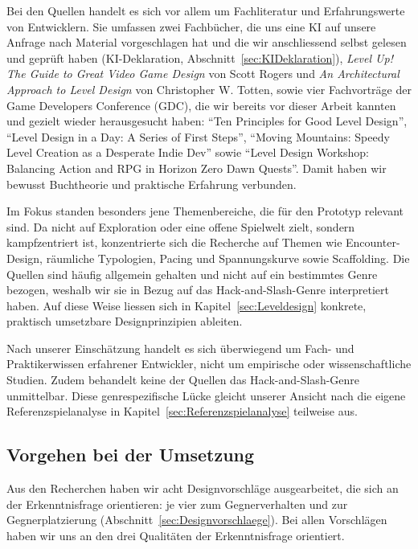 \documentclass[../Main.tex]{subfiles}
\begin{document}
Bei den Quellen handelt es sich vor allem um Fachliteratur und Erfahrungswerte von Entwicklern. Sie umfassen zwei Fachbücher, die uns eine KI auf unsere Anfrage nach Material vorgeschlagen hat und die wir anschliessend selbst gelesen und geprüft haben (KI-Deklaration, Abschnitt~\ref{sec:KIDeklaration}), \textit{Level Up! The Guide to Great Video Game Design} von Scott Rogers\autocite{rogers2014levelup} und \textit{An Architectural Approach to Level Design} von Christopher W. Totten\autocite{totten2014architectural}, sowie vier Fachvorträge der Game Developers Conference (GDC), die wir bereits vor dieser Arbeit kannten und gezielt wieder herausgesucht haben: \enquote{Ten Principles for Good Level Design}\autocite{gdc_tenprinciples2010}, \enquote{Level Design in a Day: A Series of First Steps}\autocite{gdc_leveldesignaday2020}, \enquote{Moving Mountains: Speedy Level Creation as a Desperate Indie Dev}\autocite{gdc_movingmountains2020} sowie \enquote{Level Design Workshop: Balancing Action and RPG in Horizon Zero Dawn Quests}\autocite{gdc_horizonquests2018}. Damit haben wir bewusst Buchtheorie und praktische Erfahrung verbunden.

Im Fokus standen besonders jene Themenbereiche, die für den Prototyp relevant sind. Da  nicht auf Exploration oder eine offene Spielwelt zielt, sondern kampfzentriert ist, konzentrierte sich die Recherche auf Themen wie Encounter-Design, räumliche Typologien, Pacing und Spannungskurve sowie Scaffolding. Die Quellen sind häufig allgemein gehalten und nicht auf ein bestimmtes Genre bezogen, weshalb wir sie in Bezug auf das Hack-and-Slash-Genre interpretiert haben. Auf diese Weise liessen sich in Kapitel~\ref{sec:Leveldesign} konkrete, praktisch umsetzbare Designprinzipien ableiten.

Nach unserer Einschätzung handelt es sich überwiegend um Fach- und Praktikerwissen erfahrener Entwickler, nicht um empirische oder wissenschaftliche Studien. Zudem behandelt keine der Quellen das Hack-and-Slash-Genre unmittelbar. Diese genrespezifische Lücke gleicht unserer Ansicht nach die eigene Referenzspielanalyse in Kapitel~\ref{sec:Referenzspielanalyse} teilweise aus.

\subsection{Vorgehen bei der Umsetzung} \label{sec:VorgehenUmsetzung}
Aus den Recherchen haben wir acht Designvorschläge ausgearbeitet, die sich an der Erkenntnisfrage orientieren: je vier zum Gegnerverhalten und zur Gegnerplatzierung (Abschnitt~\ref{sec:Designvorschlaege}). Bei allen Vorschlägen haben wir uns an den drei Qualitäten der Erkenntnisfrage orientiert.
\end{document}
